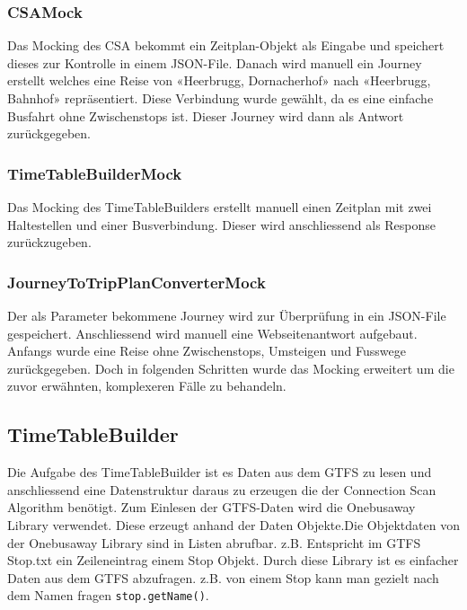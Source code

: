 \subsubsection{CSAMock}
Das Mocking des CSA bekommt ein Zeitplan-Objekt als Eingabe und speichert dieses zur Kontrolle in einem JSON-File. Danach wird manuell ein Journey erstellt welches eine Reise von «Heerbrugg, Dornacherhof» nach «Heerbrugg, Bahnhof» repräsentiert. Diese Verbindung wurde gewählt, da es eine einfache Busfahrt ohne Zwischenstops ist. Dieser Journey wird dann als Antwort zurückgegeben.

\subsubsection{TimeTableBuilderMock}
Das Mocking des TimeTableBuilders erstellt manuell einen Zeitplan mit zwei Haltestellen und einer Busverbindung. Dieser wird anschliessend als Response zurückzugeben.

\subsubsection{JourneyToTripPlanConverterMock}
Der als Parameter bekommene Journey wird zur Überprüfung in ein JSON-File gespeichert. Anschliessend wird manuell eine Webseitenantwort aufgebaut. Anfangs wurde eine Reise ohne Zwischenstops, Umsteigen und Fusswege zurückgegeben. Doch in folgenden Schritten wurde das Mocking erweitert um die zuvor erwähnten, komplexeren Fälle zu behandeln.

\subsection{TimeTableBuilder}
Die Aufgabe des TimeTableBuilder ist es Daten aus dem GTFS zu lesen und anschliessend eine Datenstruktur daraus zu erzeugen die der Connection Scan Algorithm benötigt. Zum Einlesen der GTFS-Daten wird die Onebusaway Library verwendet. Diese erzeugt anhand der Daten Objekte.Die Objektdaten von der Onebusaway Library sind in Listen abrufbar.
z.B. Entspricht im GTFS Stop.txt ein Zeileneintrag einem Stop Objekt. Durch diese Library ist es einfacher Daten aus dem GTFS abzufragen. z.B. von einem Stop kann man gezielt nach dem Namen fragen \texttt{stop.getName()}.\newline  

